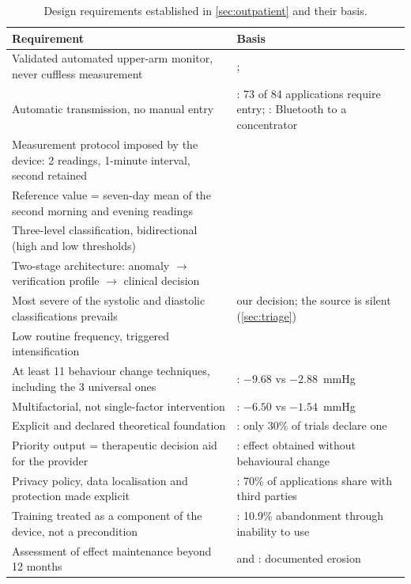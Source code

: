\documentclass[12pt,a4paper,oneside]{report}
\begin{document}
\begin{table}[htbp]
\centering\footnotesize
\caption{Design requirements established in \cref{sec:outpatient} and their basis.}\label{tab:spec13}
\begin{tabularx}{\textwidth}{@{}X >{\raggedright\arraybackslash}p{5.6cm}@{}}
\toprule
\textbf{Requirement} & \textbf{Basis} \\
\midrule
Validated automated upper-arm monitor, never cuffless measurement & \textcite{who2023hypertension}; \textcite{alessa2019} \\
Automatic transmission, no manual entry & \textcite{alessa2019}: 73 of 84 applications require entry; \textcite{mihevc2025}: Bluetooth to a concentrator \\
Measurement protocol imposed by the device: 2 readings, 1-minute interval, second retained & \textcite{mihevc2025} \\
Reference value = seven-day mean of the second morning and evening readings & \textcite{mihevc2025} \\
Three-level classification, bidirectional (high and low thresholds) & \textcite{mihevc2025} \\
Two-stage architecture: anomaly $\rightarrow$ verification profile $\rightarrow$ clinical decision & \textcite{mihevc2025} \\
Most severe of the systolic and diastolic classifications prevails & our decision; the source is silent (\cref{sec:triage}) \\
Low routine frequency, triggered intensification & \textcite{mihevc2025} \\
At least 11 behaviour change techniques, including the 3 universal ones & \textcite{zhou2024}: $-9.68$ vs $-2.88$~mmHg \\
Multifactorial, not single-factor intervention & \textcite{zhou2024}: $-6.50$ vs $-1.54$~mmHg \\
Explicit and declared theoretical foundation & \textcite{zhou2024}: only 30\% of trials declare one \\
Priority output = therapeutic decision aid for the provider & \textcite{mihevc2025}: effect obtained without behavioural change \\
Privacy policy, data localisation and protection made explicit & \textcite{alessa2019}: 70\% of applications share with third parties \\
Training treated as a component of the device, not a precondition & \textcite{mihevc2025}: 10.9\% abandonment through inability to use \\
Assessment of effect maintenance beyond 12 months & \textcite{zhou2024} and \textcite{mihevc2025}: documented erosion \\
\bottomrule
\end{tabularx}
\end{table}
\end{document}
